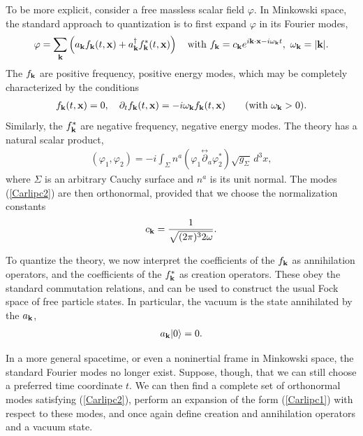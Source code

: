 \documentclass[12pt]{article}
\begin{document}
To be more explicit,  consider a free massless
scalar field $\varphi$.  In  Minkowski space, the standard approach
to quantization \cite{BirrellDavies} is to first expand $\varphi$ in its 
Fourier modes,
\begin{align}
\varphi = \sum_{\bf k} \left(a_{\bf k}f_{\bf k}(t,{\bf x}) 
  + a_{\bf k}^\dagger f_{\bf k}^*(t,{\bf x})\right) 
  \quad \mathrm{with}
  \ f_{\bf k} = c_{\bf k}e^{i{\bf k}\cdot{\bf x} - i\omega_{\bf k}t},\ 
  \omega_{\bf k} =  |{\bf k}|   .
\label{Carlipc1}
\end{align}
The $f_{\bf k}$ are positive frequency, positive energy modes,
which may be completely characterized by the conditions
\begin{align}
\Box  f_{\bf k}(t,{\bf x}) = 0, \quad 
 \partial_t f_{\bf k}(t,{\bf x}) 
   = -i\omega_{\bf k}f_{\bf k}(t,{\bf x}) \qquad\hbox{(with $\omega_{\bf k}>0$)} .
\label{Carlipc2}
\end{align}
Similarly, the $f_{\bf k}^*$  are negative frequency, negative energy modes.
The theory has a natural scalar product,
\begin{align}
(\varphi_1,\varphi_2) = -i\int_\Sigma n^a(\varphi_1
   \overset{\leftrightarrow}{\partial}_a\varphi_2^*)\sqrt{g_{\scriptscriptstyle\Sigma}}
   \,d^3x,
\label{Carlipc2a}
\end{align}
where $\Sigma$ is an arbitrary Cauchy surface  and $n^a$ is its unit normal.    
The modes (\ref{Carlipc2}) are then orthonormal, provided that we choose the
normalization constants
\begin{align}
c_{\bf k} = \frac{1}{\sqrt{(2\pi)^3 2\omega}}  .
\label{Carlipc2b}
\end{align}

To quantize the theory, we now interpret the coefficients of the $f_{\bf k}$ as 
annihilation operators, and the coefficients of the $f_{\bf k}^*$ as creation 
operators.  These obey the standard commutation relations, and can be
used to construct the usual Fock space of free particle states.  In particular,
the vacuum is the state annihilated by the $a_{\bf k}$,
\begin{align}
a_{\bf k} |0\rangle = 0  .
\label{Carlipc3}
\end{align}

In a more general spacetime, 
or even a noninertial frame in Minkowski space, the standard 
Fourier modes no longer exist.  Suppose, though, that we can still choose
a  preferred time coordinate $t$.  We can then find a complete set 
of orthonormal modes satisfying (\ref{Carlipc2}),  perform an expansion 
of the form (\ref{Carlipc1}) with respect to these modes, and once again 
define creation and annihilation operators and a vacuum state.  
\end{document}

